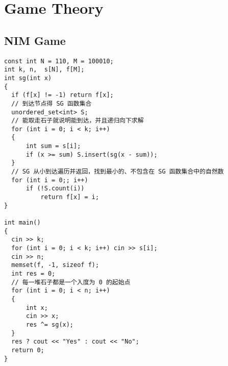 \section{Game Theory}
\subsection{NIM Game}
\begin{lstlisting}
const int N = 110, M = 100010;
int k, n,  s[N], f[M];
int sg(int x)
{
  if (f[x] != -1) return f[x];
  // 到达节点得 SG 函数集合
  unordered_set<int> S;
  // 能取走石子就说明能到达，并且递归向下求解
  for (int i = 0; i < k; i++)
  {
      int sum = s[i];
      if (x >= sum) S.insert(sg(x - sum));
  }
  // SG 从小到达遍历并返回，找到最小的、不包含在 SG 函数集合中的自然数
  for (int i = 0;; i++)
      if (!S.count(i))
          return f[x] = i;
}

int main()
{
  cin >> k;
  for (int i = 0; i < k; i++) cin >> s[i];
  cin >> n;
  memset(f, -1, sizeof f);
  int res = 0;
  // 每一堆石子都是一个入度为 0 的起始点
  for (int i = 0; i < n; i++)
  {
      int x;
      cin >> x;
      res ^= sg(x);
  }
  res ? cout << "Yes" : cout << "No";
  return 0;
}
\end{lstlisting}
